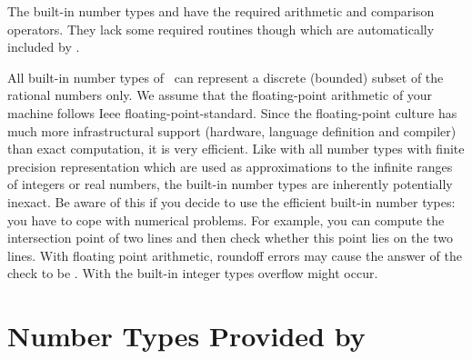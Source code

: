 The built-in number types  and  have the
required arithmetic and comparison operators. They lack some required
routines though which are automatically included by \cgal.

All built-in number types of \CC\ can represent a discrete (bounded)
subset of the rational numbers only.  We assume that the
floating-point arithmetic of your machine follows {\sc Ieee}
floating-point-standard.  Since the floating-point culture has much
more infrastructural support (hardware, language definition and
compiler) than exact computation, it is very efficient.
Like with all number types with finite precision representation
which are used as approximations to the infinite ranges of 
integers or real numbers, the built-in number types are inherently
potentially inexact.
Be aware of this if you decide to use the efficient built-in 
number types: you have to cope with numerical problems.  
For example, you can compute the intersection point of two lines and 
then check whether this point lies on the two lines. 
With floating point arithmetic,
roundoff errors may cause the answer of the check to be . 
With the built-in integer types overflow might occur.

\section{Number Types Provided by \cgal}


